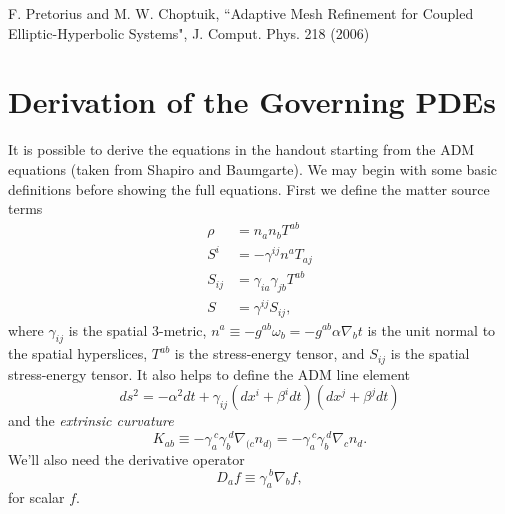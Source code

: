 \documentclass[12pt]{article}
\numberwithin{equation}{section}
\begin{document}
\begin{thebibliography}{widestlabel}
	F. Pretorius and M. W. Choptuik, ``Adaptive Mesh Refinement for Coupled Elliptic-Hyperbolic Systems", J. Comput. Phys. 218 (2006)
\end{thebibliography}

\appendix
\section{Derivation of the Governing PDEs}
It is possible to derive the equations in the handout starting from the ADM equations (taken from Shapiro and Baumgarte).  We may begin with some basic definitions before showing the full equations.  First we define the matter source terms
\begin{align}
\rho &= n_a n_b T^{ab} \\
S^i &= -\gamma^{ij} n^a T_{aj} \\
S_{ij} &= \gamma_{ia} \gamma_{jb} T^{ab} \\
S &= \gamma^{ij} S_{ij},
\end{align}
where $\gamma_{ij}$ is the spatial 3-metric, $n^a \equiv - g^{ab} \omega_b = -g^{ab} \alpha \nabla_b t$ is the unit normal to the spatial hyperslices, $T^{ab}$ is the stress-energy tensor, and $S_{ij}$ is the spatial stress-energy tensor.  It also helps to define the ADM line element
\begin{equation} \label{eq:ADM_line_element}
ds^2 = -\alpha^2 dt + \gamma_{ij} (dx^i + \beta^i dt) (dx^j + \beta^j dt)
\end{equation}
and the \textit{extrinsic curvature}
\begin{equation}
K_{ab} \equiv - \gamma_a^{~c} \gamma_b^{~d} \nabla_{(c} n_{d)} = - \gamma_a^{~c} \gamma_b^{~d} \nabla_c n_d.
\end{equation}
We'll also need the derivative operator
\begin{equation}
D_a f \equiv \gamma_{a}^{~b} \nabla_b f,
\end{equation}
for scalar $f$.
\end{document}
